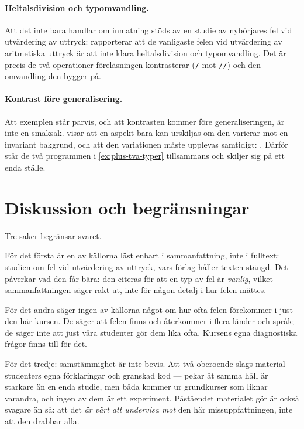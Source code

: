 \paragraph{Heltalsdivision och typomvandling.}  Att det inte bara handlar
om inmatning stöds av en studie av nybörjares fel vid utvärdering av
uttryck: \textcite{Gobil2009Errors} rapporterar att de vanligaste felen
vid utvärdering av aritmetiska uttryck är att inte klara heltalsdivision
och typomvandling.  Det är precis de två operationer föreläsningen
kontrasterar (\texttt{/} mot \texttt{//}) och den
omvandling den bygger på.

\paragraph{Kontrast före generalisering.}  Att exemplen står parvis, och
att kontrasten kommer före generaliseringen, är inte en smaksak.
\Textcite[45--47]{Marton2015} visar att en aspekt bara kan urskiljas om
den varierar mot en invariant bakgrund, och att den variationen måste
upplevas samtidigt: .  Därför står de två
programmen i \cref{ex:plus-tva-typer} tillsammans och skiljer sig på
ett enda ställe.

\section{Diskussion och begränsningar}
\label{sec:input-diskussion}

Tre saker begränsar svaret.

För det första är en av källorna läst enbart i sammanfattning, inte i
fulltext: studien om fel vid utvärdering av uttryck, vars förlag håller
texten stängd.  Det påverkar vad den får bära: den citeras för att en
typ av fel är \emph{vanlig}, vilket sammanfattningen säger rakt ut, inte
för någon detalj i hur felen mättes.

För det andra säger ingen av källorna något om hur ofta felen
förekommer i just den här kursen.  De säger att felen finns och
återkommer i flera länder och språk; de säger inte att just våra
studenter gör dem lika ofta.  Kursens egna diagnostiska frågor finns
till för det.

För det tredje: samstämmighet är inte bevis.  Att två oberoende slags
material --- studenters egna förklaringar och granskad kod --- pekar åt
samma håll är starkare än en enda studie, men båda kommer ur
grundkurser som liknar varandra, och ingen av dem är ett experiment.
Påståendet materialet gör är också svagare än så: att det \emph{är värt
att undervisa mot} den här missuppfattningen, inte att den drabbar alla.


